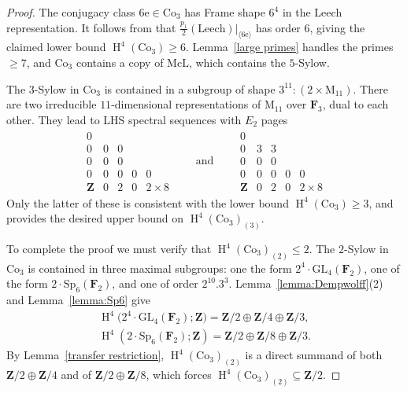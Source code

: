 \documentclass[pdftex]{sigma}
\numberwithin{equation}{section}
\newcommand\bF{\mathbf F}
\newcommand\bZ{\mathbf Z}
\newcommand\re{\mathrm e}
\newcommand\rM{\mathrm M}
\DeclareMathOperator\homology{H}
\renewcommand\H{\homology}
\newcommand\<\langle
\renewcommand\>\rangle
\newcommand\Co{\mathrm{Co}}
\newcommand\Leech{\mathrm{Leech}}
\newcommand{\GL}{\mathrm{GL}}
\newcommand{\Sp}{\mathrm{Sp}}
\begin{document}
\begin{proof}The conjugacy class $6\re \in \Co_3$ has Frame shape $6^4$ in the Leech representation. It follows from \cite[Theorem 7.1]{jft} that $\frac{p_1}2(\Leech)|_{\langle 6\re\rangle}$ has order $6$, giving the claimed lower bound $\H^4(\Co_3) \geq 6$.
Lemma~\ref{large primes} handles the primes $\geq 7$, and $\Co_3$ contains a copy of $\mathrm{McL}$, which contains the $5$-Sylow.

The $3$-Sylow in $\Co_3$ is contained in a subgroup of shape $3^{11}:(2 \times \rM_{11})$. There are two irreducible $11$-dimensional representations of $\rM_{11}$ over $\bF_3$, dual to each other. They lead to LHS spectral sequences with $E_2$ pages
\begin{gather*}
 \begin{array}{ccccc}
 0 \\
 0 & 0 & 0 \\
 0 & 0 & 0 \\
 0 & 0 & 0 & 0 & 0 \\
 \bZ & 0 & 2 & 0 & 2 \times 8
 \end{array}
 \qquad \text{and} \qquad
 \begin{array}{ccccc}
 0 \\
 0 & 3 & 3 \\
 0 & 0 & 0 \\
 0 & 0 & 0 & 0 & 0 \\
 \bZ & 0 & 2 & 0 & 2 \times 8
 \end{array}
\end{gather*}
Only the latter of these is consistent with the lower bound $\H^4(\Co_3) \geq 3$, and provides the desired upper bound {on $\H^4(\Co_3)_{(3)}$}.

To complete the proof we must verify that $\H^4(\Co_3)_{(2)} \leq 2$. The $2$-Sylow in $\Co_3$ is contained in three maximal subgroups: one the form $2^4 \cdot \GL_4(\bF_2)$, one of the form $2 \cdot \Sp_6(\bF_2)$, and one of order $2^{10}.3^3$. Lemma~\ref{lemma:Dempwolff}(2) and Lemma~\ref{lemma:Sp6} give
\begin{gather*}
 \H^4\big(2^4 \cdot \GL_4(\bF_2);\bZ\big) = \bZ/2 \oplus \bZ/4 \oplus \bZ/3, \\
 \H^4(2 \cdot \Sp_6(\bF_2);\bZ) = \bZ/2 \oplus \bZ/8 \oplus \bZ/3.
\end{gather*}
By Lemma~\ref{transfer restriction}, $\H^4(\Co_3)_{(2)}$ is a direct summand of both $\bZ/2 \oplus \bZ/4$ and of $\bZ/2 \oplus \bZ/8$, which forces $\H^4(\Co_3)_{(2)} \subseteq \bZ/2$.
\end{proof}
\end{document}
